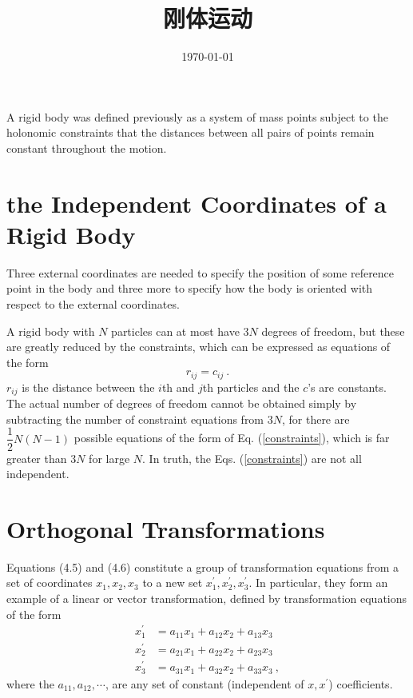 \documentclass[12pt,a4paper]{article}
\title{刚体运动}
\author{}
\date{\today}
\begin{document}
\maketitle

\cite{goldstein2011classical} A rigid body was defined previously as a system of mass points subject to the holonomic constraints that the distances between all pairs of points remain constant throughout the motion. 

\section{the Independent Coordinates of a Rigid Body}
\cite{goldstein2011classical} Three external coordinates are needed to specify the position of some reference point
in the body and three more to specify how the body is oriented with respect to the external coordinates.

A rigid body with $N$ particles can at most have $3N$ degrees of freedom, but these are greatly reduced by the constraints, which can be expressed as equations of the form
\begin{equation}
r_{ij} = c_{ij} ~.
\label{constraints}
\end{equation}
$r_{ij}$ is the distance between the $i$th and $j$th particles and the $c$'s are constants. The actual number of degrees of freedom cannot be obtained simply by subtracting the number of constraint equations from $3N$, for there are $\dfrac{1}{2} N(N -1)$ possible equations of the form of Eq. (\ref{constraints}), which is far greater than $3N$ for large $N$. In truth, the Eqs. (\ref{constraints}) are not all independent.


\section{Orthogonal Transformations}
\cite{goldstein2011classical} 


Equations (4.5) and (4.6) constitute a group of transformation equations from a set of coordinates $x_1, x_2, x_3$ to a new set $x^\prime_1, x^\prime_2, x^\prime_3$. In particular, they form an example of a linear or vector transformation, defined by transformation equations of the form
\begin{eqnarray}
\nonumber x^\prime_1 &= a_{11} x_1 + a_{12} x_2 + a_{13} x_3 ~ \\
x^\prime_2 &= a_{21} x_1 + a_{22} x_2 + a_{23} x_3 ~ \\
\nonumber x^\prime_3 &= a_{31} x_1 + a_{32} x_2 + a_{33} x_3 ~,
\end{eqnarray}
where the $a_{11}, a_{12}, \cdots$, are any set of constant (independent of $x, x^\prime$) coefficients.
\end{document}
